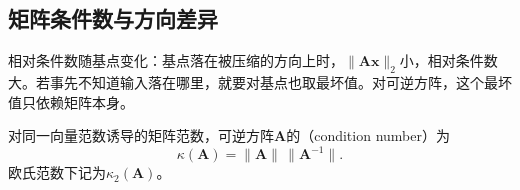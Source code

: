 \subsection{矩阵条件数与方向差异}
\label{sec:ls-matrix-condition-number}

相对条件数随基点变化：基点落在被压缩的方向上时，$\lVert\bm A\bm x\rVert_2$小，相对条件数大。若事先不知道输入落在哪里，就要对基点也取最坏值。对可逆方阵，这个最坏值只依赖矩阵本身。

\begin{definition}[可逆矩阵的条件数]
\label{def:matrix-analysis-condition-number}
对同一向量范数诱导的矩阵范数，可逆方阵$\bm A$的（condition number）为
\begin{equation}
 \kappa(\bm A)=\lVert\bm A\rVert\,\lVert\bm A^{-1}\rVert .
 \label{eq:matrix-analysis-condition-number}
\end{equation}
欧氏范数下记为$\kappa_2(\bm A)$。
\end{definition}


